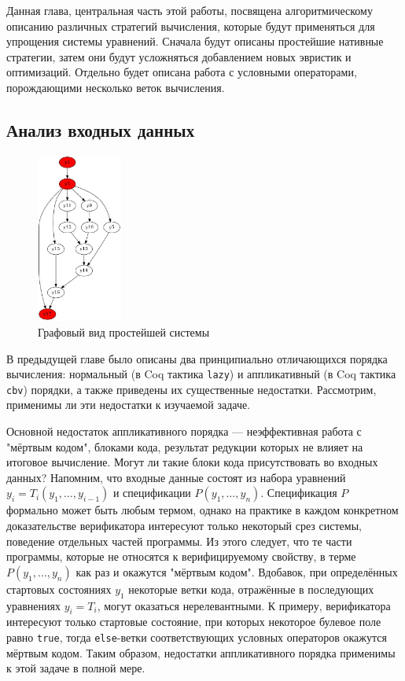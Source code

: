 \documentclass[../diploma.tex]{subfiles}
\begin{document}
\label{sec:2}
\graphicspath{ {../images/} }

Данная глава, центральная часть этой работы, посвящена алгоритмическому описанию различных стратегий вычисления, которые будут применяться для упрощения системы уравнений. Сначала будут описаны простейшие нативные стратегии, затем они будут усложняться добавлением новых эвристик и оптимизаций. Отдельно будет описана работа с условными операторами, порождающими несколько веток вычисления.

\subsection{Анализ входных данных}\label{analysis}

\begin{figure}
    \centering
    \includegraphics[width=0.25\textwidth]{graph_simple1.jpeg}
    \caption{Графовый вид простейшей системы}\label{graph_simple1}
\end{figure}

В предыдущей главе было описаны два принципиально отличающихся порядка вычисления: нормальный (в Coq тактика \texttt{lazy}) и аппликативный (в Coq тактика \texttt{cbv}) порядки, а также приведены их существенные недостатки. Рассмотрим, применимы ли эти недостатки к изучаемой задаче.

Основной недостаток аппликативного порядка --- неэффективная работа с "мёртвым кодом", блоками кода, результат редукции которых не влияет на итоговое вычисление. Могут ли такие блоки кода присутствовать во входных данных? Напомним, что входные данные состоят из набора уравнений $y_i = T_i(y_1, \dots, y_{i - 1})$ и спецификации $P(y_1, \dots, y_n)$. Спецификация $P$ формально может быть любым термом, однако на практике в каждом конкретном доказательстве верификатора интересуют только некоторый срез системы, поведение отдельных частей программы. Из этого следует, что те части программы, которые не относятся к верифицируемому свойству, в терме $P(y_1, \dots, y_n)$ как раз и окажутся "мёртвым кодом". Вдобавок, при определённых стартовых состояниях $y_1$ некоторые ветки кода, отражённые в последующих уравнениях $y_i = T_i$, могут оказаться нерелевантными. К примеру, верификатора интересуют только стартовые состояние, при которых некоторое булевое поле равно \texttt{true}, тогда \texttt{else}-ветки соответствующих условных операторов окажутся мёртвым кодом. Таким образом, недостатки аппликативного порядка применимы к этой задаче в полной мере.
\end{document}
